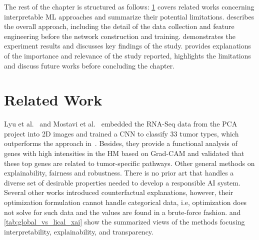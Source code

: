 \hspace*{3.5mm} The rest of the chapter is structured as follows: \cref{chapter_5:rw} covers related works concerning interpretable ML approaches and summarize their potential limitations.  describes the overall approach, including the detail of the data collection and feature engineering before the network construction and training.  demonstrates the experiment results and discusses key findings of the study.  provides explanations of the importance and relevance of the study reported, highlights the limitations and discuss future works before concluding the chapter.

\section{Related Work}\label{chapter_5:rw}
Lyu et al.~\cite{lyu2018deep} and Mostavi et al.~\cite{mostavi2019convolutional} embedded the RNA-Seq data from the PCA project into 2D images and trained a CNN to classify 33 tumor types, which outperforms the approach in~\cite{li2017comprehensive}. Besides, they provide a functional analysis of genes with high intensities in the HM based on Grad-CAM and validated that these top genes are related to tumor-specific pathways. Other general methods on explainability, fairness and robustness. There is no prior art that handles a diverse set of desirable properties needed to develop a responsible AI system. Several other works introduced counterfactual explanations, however, their optimization formulation cannot handle categorical data, i.e, optimization does not solve for such data and the values are found in a brute-force fashion.  and \cref{tab:global_vs_lical_xai} show the summarized views of the methods focusing interpretability, explainability, and transparency. 

